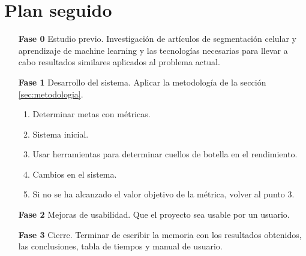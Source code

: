 \section{Plan seguido}\label{sec:planactualizado}

\begin{itemize}
\item[\textbf{Fase 0}] Estudio previo. Investigación de artículos de segmentación celular y aprendizaje de machine learning y las tecnologías necesarias para llevar a cabo resultados similares aplicados al problema actual.
\item[\textbf{Fase 1}] Desarrollo del sistema. Aplicar la metodología de la sección \ref{sec:metodologia}.
\begin{enumerate}
\item Determinar metas con métricas.
\item Sistema inicial.
\item Usar herramientas para determinar cuellos de botella en el rendimiento.
\item Cambios en el sistema.
\item Si no se ha alcanzado el valor objetivo de la métrica, volver al punto 3.
\end{enumerate}
\item[\textbf{Fase 2}] Mejoras de usabilidad. Que el proyecto sea usable por un usuario.
\item[\textbf{Fase 3}] Cierre. Terminar de escribir la memoria con los resultados obtenidos, las conclusiones, tabla de tiempos y manual de usuario.
\end{itemize}
